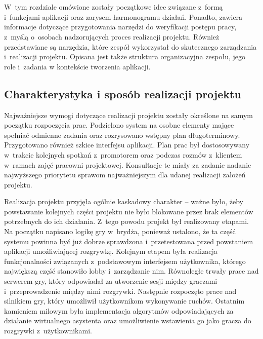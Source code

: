 \chapter{\ChapterTitleWorkOrganization}
\label{sec:organizacja-pracy}

W~tym rozdziale omówione zostały początkowe idee związane
z~formą i~funkcjami
aplikacji oraz zarysem harmonogramu działań.
Ponadto, zawiera informacje dotyczące przygotowania
narzędzi do weryfikacji postępu pracy, z~myślą o~osobach
nadzorujących proces
realizacji projektu.
Również przedstawiane
są narzędzia, które zespół wykorzystał do skutecznego
zarządzania
i~realizacji projektu. Opisana jest także struktura
organizacyjna
zespołu, jego role i~zadania w kontekście tworzenia
aplikacji.



\section{Charakterystyka i sposób realizacji projektu}

Najważniejsze wymogi dotyczące realizacji projektu
zostały określone na samym początku rozpoczęcia prac. Podzielono system na osobne elementy
mające spełniać odmienne zadania oraz rozrysowano wstępny plan długoterminowy. Przygotowano
również szkice interfejsu aplikacji. Plan prac był dostosowywany w~trakcie
kolejnych spotkań z~promotorem oraz
podczas rozmów z~klientem w~ramach zajęć pracowni projektowej.
Konsultacje te miały za zadanie nadanie najwyższego priorytetu
sprawom najważniejszym
dla udanej realizacji założeń projektu.

Realizacja projektu przyjęła ogólnie kaskadowy charakter --
ważne było, żeby powstawanie kolejnych części projektu nie było blokowane przez
brak elementów potrzebnych do ich działania. Z~tego powodu projekt był realizowany
etapami. Na początku napisano logikę gry w~brydża, ponieważ ustalono, że ta część
systemu powinna być już dobrze sprawdzona i~przetestowana przed powstaniem
aplikacji umożliwiającej rozgrywkę. Kolejnym etapem była realizacja funkcjonalności
związanych z~podstawowym interfejsem użytkownika, którego największą część
stanowiło lobby i~zarządzanie nim. Równoległe trwały prace nad serwerem gry, który
odpowiadał za utworzenie sesji między graczami i~przeprowadzenie między nimi rozgrywki.
Następnie rozpoczęto prace nad silnikiem gry, który
umożliwił użytkownikom wykonywanie ruchów. Ostatnim kamieniem milowym była implementacja
algorytmów odpowiadających za działanie wirtualnego asystenta oraz umożliwienie
wstawienia go jako gracza do rozgrywki z~użytkownikami.

